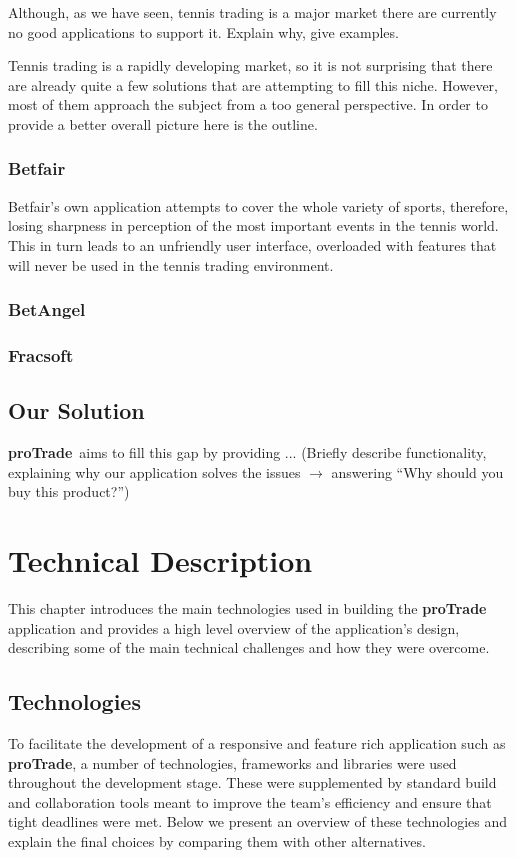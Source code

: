 \documentclass[10pt]{report}
\newcommand{\nm}{{\bf proTrade}}
\newcommand{\nmsp}{{\nm \ }}
\begin{document}
Although, as we have seen, tennis trading is a major market there are currently no good applications to support it.
Explain why, give examples.

Tennis trading is a rapidly developing market, so it is not surprising that there are already quite a few solutions that are attempting to fill this niche. However, most of them approach the subject from a too general perspective. In order to provide a better overall picture here is the outline.

\subsection{Betfair}

Betfair's own application attempts to cover the whole variety of sports, therefore, losing sharpness in perception of the most important events in the tennis world. This in turn leads to an unfriendly user interface, overloaded with features that will never be used in the tennis trading environment.

\subsection{BetAngel}

\subsection{Fracsoft}

\section{Our Solution}

\nmsp aims to fill this gap by providing ... (Briefly describe functionality, explaining why our application solves the issues $\rightarrow$ answering ``Why should you buy this product?'')

\chapter{Technical Description}

This chapter introduces the main technologies used in building the {\nmsp} application and provides a high level overview of the application's design, describing some of the main technical challenges and how they were overcome.

\section{Technologies}
To facilitate the development of a responsive and feature rich application such as {\nm}, a number of technologies, frameworks and libraries were used throughout the development stage. These were supplemented by standard build and collaboration tools meant to improve the team's efficiency and ensure that tight deadlines were met.
Below we present an overview of these technologies and explain the final choices by comparing them with other alternatives.
\end{document}
